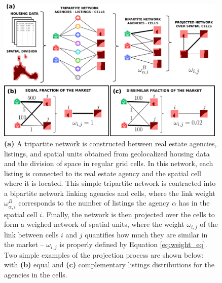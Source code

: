 \begin{figure}[t]
    \centering
    \includegraphics[width =0.98\textwidth]{Figs/Idealista_segmentation/NETWORK.pdf}
	\caption[Bipartite network construction and projection.]{ \textbf{(a)} A tripartite network is constructed between real estate agencies, listings, and spatial units obtained from geolocalized housing data and the division of space in regular grid cells. In this network, each listing is connected to its real estate agency and the spatial cell where it is located. This simple tripartite network is contracted into a bipartite network linking agencies and cells, where the link weight $\omega^{B}_{\alpha,i}$ corresponds to the number of listings the agency $\alpha$ has in the spatial cell $i$. Finally, the network is then projected over the cells to form a weighed network of spatial units, where the weight $\omega_{i,j}$ of the link between cells $i$ and $j$ quantifies how much they are similar in the market -- $\omega_{i,j}$ is properly defined by Equation \eqref{eq:weight_eq}. Two simple examples of the projection process are shown below: with \textbf{(b)} equal and \textbf{(c)} complementary listings distributions for the agencies in the cells. \label{fig:network_construction}}
\end{figure}

